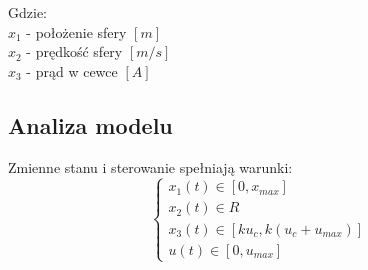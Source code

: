 Gdzie:
\\$x_{1}$ - położenie sfery $[m]$
\\$x_{2}$ - prędkość sfery $[m/s]$
\\$x_{3}$ - prąd w cewce $[A]$ \newline

\subsection{Analiza modelu}

Zmienne stanu i sterowanie spełniają warunki:
\begin{equation}
\begin{cases}
x_1(t) \in [0, x_{max}] \\
x_2(t) \in R \\
x_3(t) \in [ku_c, k(u_c+u_{max})] \\
u(t) \in [0, u_{max}]
\end{cases}
\end{equation}



